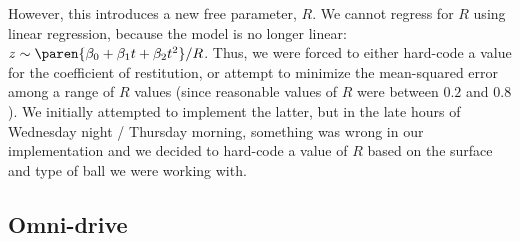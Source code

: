 \documentclass[letterpaper, 11pt]{article}
\begin{document}
However, this introduces a new free parameter, $R$. We cannot regress for $R$ using linear regression, because the model is no longer linear: $z \sim \paren{\beta_0 + \beta_1 t + \beta_2 t^2} / R$. Thus, we were forced to either hard-code a value for the coefficient of restitution, or attempt to minimize the mean-squared error among a range of $R$ values (since reasonable values of $R$ were between $0.2$ and $0.8$). We initially attempted to implement the latter, but in the late hours of Wednesday night / Thursday morning, something was wrong in our implementation and we decided to hard-code a value of $R$ based on the surface and type of ball we were working with.

\subsection{Omni-drive}
\end{document}
